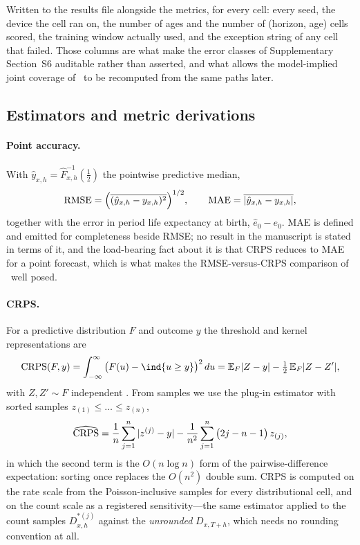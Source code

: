 Written to the results file alongside the metrics, for every cell: every seed,
the device the cell ran on, the number of ages and the number of (horizon,
age) cells scored, the training window actually used, and the exception string
of any cell that failed. Those columns are what make the error classes of
Supplementary Section~S6 auditable rather than asserted, and what allows
the model-implied joint coverage of \Hthree\ to be recomputed from the same
paths later.

\subsection{Estimators and metric derivations}
\label{supp:methods-metrics}

\paragraph{Point accuracy.} With $\hat y_{x,h} = \hat F^{-1}_{x,h}(\tfrac12)$
the pointwise predictive median,
\begin{equation}
  \operatorname{RMSE} = \Big(\overline{(\hat y_{x,h}-y_{x,h})^2}\Big)^{1/2},\qquad
  \operatorname{MAE} = \overline{|\hat y_{x,h}-y_{x,h}|},
\end{equation}
together with the error in period life expectancy at birth, $\hat e_0-e_0$.
MAE is defined and emitted for completeness beside RMSE; no result in the
manuscript is stated in terms of it, and the load-bearing fact about it is
that CRPS reduces to MAE for a point forecast, which is what makes the
RMSE-versus-CRPS comparison of \Hone\ well posed.

\paragraph{CRPS.} For a predictive distribution $F$ and outcome $y$ the
threshold and kernel representations are
\begin{equation}
  \CRPS(F,y) = \int_{-\infty}^{\infty}\big(F(u)-\ind\{u\ge y\}\big)^2\,du
  = \E_F|Z-y| - \tfrac12\,\E_F|Z-Z'|,
\end{equation}
with $Z,Z'\sim F$ independent \citep{gneiting2007strictly}. From samples we use
the plug-in estimator with sorted samples $z_{(1)}\le\dots\le z_{(n)}$,
\begin{equation}
  \widehat{\operatorname{CRPS}} = \frac1n\sum_{j=1}^{n}|z^{(j)}-y|
  - \frac{1}{n^2}\sum_{j=1}^{n}\big(2j-n-1\big)\,z_{(j)},
  \label{eq:crps-sample}
\end{equation}
in which the second term is the $O(n\log n)$ form of the pairwise-difference
expectation: sorting once replaces the $O(n^2)$ double sum. CRPS is computed
on the rate scale from the Poisson-inclusive samples for every distributional
cell, and on the count scale as a registered sensitivity---the same estimator
applied to the count samples $D^{\ast(j)}_{x,h}$ against the \emph{unrounded}
$D_{x,T+h}$, which needs no rounding convention at all.

